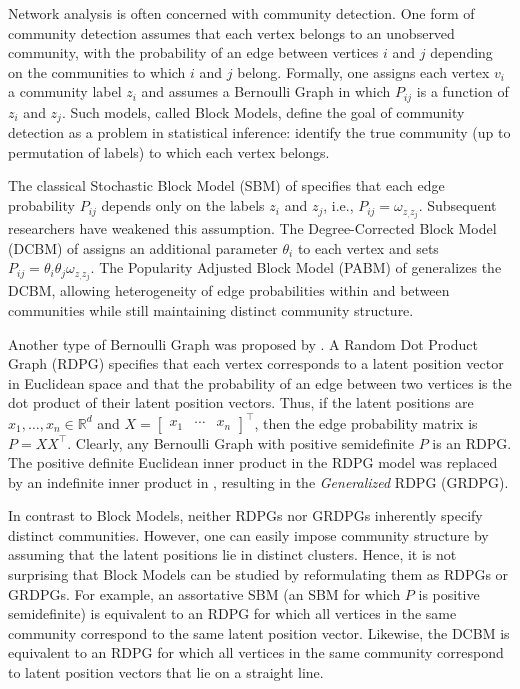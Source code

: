 \documentclass[12pt]{article}
\begin{document}
Network analysis is often concerned with community detection.  One form of community detection assumes that each vertex belongs to an unobserved community, with the probability of an edge between vertices $i$ and $j$ depending on the communities to which $i$ and $j$ belong.  Formally, one assigns each vertex $v_i$ a community label $z_i$ and assumes a Bernoulli Graph in which $P_{ij}$ is a function of $z_i$ and $z_j$.  Such models, called Block Models, define the goal of community detection as a problem in statistical inference: identify the true community (up to permutation of labels) to which each vertex belongs.

The classical Stochastic Block Model (SBM) of \citet{doi:10.1080/0022250X.1971.9989788} specifies that each edge probability $P_{ij}$ depends only on the labels $z_i$ and $z_j$, i.e., $P_{ij} = \omega_{z_,z_j}$.  Subsequent researchers have weakened this assumption.   The Degree-Corrected Block Model (DCBM) of \citet{Karrer_2011} assigns an additional parameter $\theta_i$ to each vertex and sets $P_{ij} = \theta_i \theta_j \omega_{z_,z_j}$. The Popularity Adjusted Block Model (PABM) of \citet{307cbeb9b1be48299388437423d94bf1} generalizes the DCBM, allowing heterogeneity of edge probabilities within and between communities while still maintaining distinct community structure.

Another type of Bernoulli Graph was proposed by
\citet*{10.1007/978-3-540-77004-6_11}.  A Random Dot Product Graph
(RDPG) specifies that each vertex corresponds to a latent position
vector in Euclidean space and that the probability of an edge between
two vertices is the dot product of their latent position vectors.
Thus, if the latent positions are $x_1,\ldots,x_n \in \mathbb{R}^d$
and $X = [\begin{array}{ccc} x_1 & \cdots & x_n \end{array} ]^\top$,
then the edge probability matrix is $P = XX^\top$.  Clearly, any
Bernoulli Graph with positive semidefinite $P$ is an RDPG.  The
positive definite Euclidean inner product in the RDPG model was
replaced by an indefinite inner product in
\citet{rubindelanchy2017statistical}, resulting in the {\em
Generalized}\/ RDPG (GRDPG).

In contrast to Block Models, neither RDPGs nor GRDPGs inherently
specify distinct communities.  However, one can easily impose
community structure by assuming that the latent positions lie in
distinct clusters.  Hence, it is not surprising that Block Models can
be studied by reformulating them as RDPGs or GRDPGs.  For example, an
assortative SBM (an SBM for which $P$ is positive semidefinite) is
equivalent to an RDPG for which all vertices in the same community
correspond to the same latent position vector.
Likewise, the DCBM is equivalent to an RDPG for which all vertices in
the same community correspond to latent position vectors that lie on a
straight line. %
\end{document}
